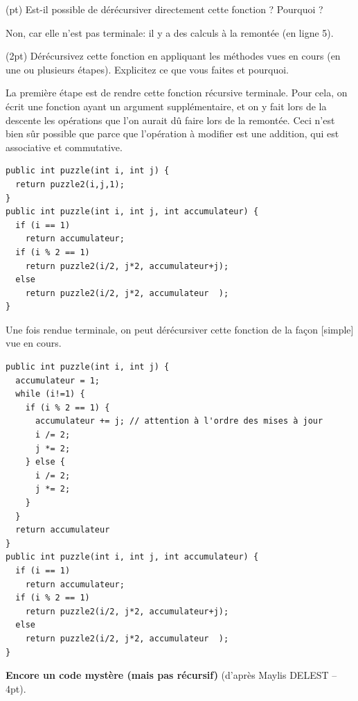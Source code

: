 \documentclass[10pt]{article}\usepackage[nu]{esial}
\begin{document}
\Question(\textonehalf pt) Est-il possible de dérécursiver directement cette
fonction ? Pourquoi ? 

\begin{Reponse}
  Non, car elle n'est pas terminale: il y a des calculs à la remontée (en ligne
  5). 
\end{Reponse}

\Question(2pt) Dérécursivez cette fonction en appliquant les méthodes vues en
cours (en une ou plusieurs étapes). Explicitez ce que vous faites et pourquoi.

\begin{Reponse}
  La première étape est de rendre cette fonction récursive terminale. Pour
  cela, on écrit une fonction ayant un argument supplémentaire, et on y fait
  lors de la descente les opérations que l'on aurait dû faire lors de la
  remontée. Ceci n'est bien sûr possible que parce que l'opération à modifier
  est une addition, qui est associative et commutative.

  \begin{Verbatim}
public int puzzle(int i, int j) {
  return puzzle2(i,j,1);
}
public int puzzle(int i, int j, int accumulateur) {
  if (i == 1)     
    return accumulateur;
  if (i % 2 == 1)
    return puzzle2(i/2, j*2, accumulateur+j);
  else 
    return puzzle2(i/2, j*2, accumulateur  );
}
  \end{Verbatim}

Une fois rendue terminale, on peut dérécursiver cette fonction de la façon
[simple] vue en cours.

  \begin{Verbatim}
public int puzzle(int i, int j) {
  accumulateur = 1;
  while (i!=1) {
    if (i % 2 == 1) {
      accumulateur += j; // attention à l'ordre des mises à jour
      i /= 2;
      j *= 2;
    } else {
      i /= 2;
      j *= 2;
    }
  }
  return accumulateur
}
public int puzzle(int i, int j, int accumulateur) {
  if (i == 1)     
    return accumulateur;
  if (i % 2 == 1)
    return puzzle2(i/2, j*2, accumulateur+j);
  else 
    return puzzle2(i/2, j*2, accumulateur  );
}
  \end{Verbatim}

\end{Reponse}

\bigskip\Exercice\textbf{Encore un code mystère (mais pas récursif)} (d'après
Maylis DELEST -- 4pt).
\end{document}
